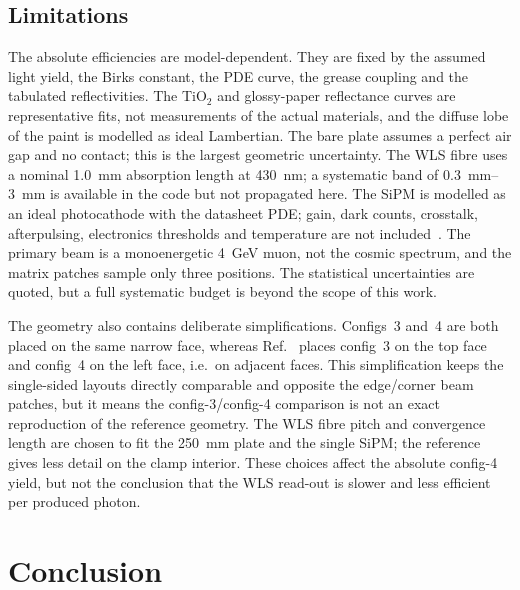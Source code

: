 \documentclass[preprint,12pt]{elsarticle}
\begin{document}
\subsection{Limitations}

The absolute efficiencies are model-dependent. They are fixed by the assumed
light yield, the Birks constant, the PDE curve, the grease coupling and the
tabulated reflectivities. The TiO$_2$ and glossy-paper reflectance curves are
representative fits, not measurements of the actual materials, and the diffuse
lobe of the paint is modelled as ideal Lambertian. The bare plate assumes a
perfect air gap and no contact; this is the largest geometric uncertainty. The
WLS fibre uses a nominal \SI{1.0}{\milli\meter} absorption length at
\SI{430}{\nano\meter}; a systematic band of \SIrange{0.3}{3}{\milli\meter} is
available in the code but not propagated here. The SiPM is modelled as an ideal
photocathode with the datasheet PDE; gain, dark counts, crosstalk,
afterpulsing, electronics thresholds and temperature are not
included~\cite{Anfimov2021}. The primary beam is a monoenergetic
\SI{4}{\giga\electronvolt} muon, not the cosmic spectrum, and the matrix patches
sample only three positions. The statistical uncertainties are quoted, but a
full systematic budget is beyond the scope of this work.

The geometry also contains deliberate simplifications. Configs~3 and~4 are both
placed on the same narrow face, whereas Ref.~\cite{Rao2025} places config~3 on
the top face and config~4 on the left face, i.e.\ on adjacent faces. This
simplification keeps the single-sided layouts directly comparable and opposite
the edge/corner beam patches, but it means the config-3/config-4 comparison is
not an exact reproduction of the reference geometry. The WLS fibre pitch and
convergence length are chosen to fit the \SI{250}{\milli\meter} plate and the
single SiPM; the reference gives less detail on the clamp interior. These choices
affect the absolute config-4 yield, but not the conclusion that the WLS read-out
is slower and less efficient per produced photon.

\section{Conclusion}
\label{sec:conclusion}
\end{document}
